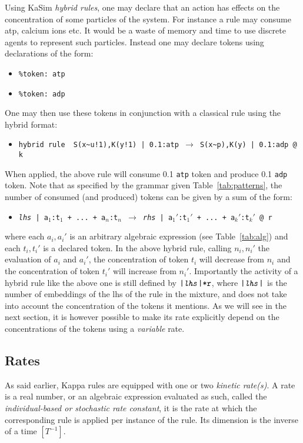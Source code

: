 \documentclass[11pt]{book}
\def\int{\hbox{\texttt{\~}}}
\def\ttt#1{\texttt{#1}}
\def\var#1{\textquotesingle #1\textquotesingle}
\def\rar{\rightarrow}
\def\ITE#1{\begin{itemize}#1\end{itemize}}
\def\imp#1{\emph{#1}\index{#1}}
\begin{document}
Using KaSim \imp{hybrid rules}, one may declare that an action has effects on the concentration of some particles of the system. For instance a rule may consume atp, calcium ions etc. It would be a waste of memory and time to use discrete agents to represent such particles. Instead one may declare tokens using declarations of the form:
\ITE{
\item[] \ttt{\%token: atp} 
\item[] \ttt{\%token: adp} 
}
One may then use these tokens in conjunction with a classical rule using the hybrid format:
\ITE{
\item[] \ttt{\var{hybrid rule}~ S(x\int u!1),K(y!1)\ |\ 0.1:atp $\rar$ S(x\int p),K(y)\ |\ 0.1:adp\ @ \var{k}} 
}
When applied, the above rule will consume 0.1 \ttt{atp} token and produce 0.1 \ttt{adp} token. Note that as specified by the grammar given Table~\ref{tab:patterns}, the number of consumed (and produced) tokens can be given by a sum of the form:
\ITE{
\item[] \ttt{\textit{lhs} | a$_1$:t$_1$ + ... + a$_n$:t$_n$ $\rar$ \textit{rhs} | a$_1'$:t$_1'$ + ... + a$_k'$:t$_k'$ @ r} 
}
where each $a_i,a_i'$ is an arbitrary algebraic expression (see Table~\ref{tab:alg}) and each $t_i,t_i'$ is a declared token. In the above hybrid rule, calling $n_i,n_i'$  the evaluation of $a_i$ and $a_i'$, the concentration of token $t_i$ will decrease from $n_i$ and the concentration of token $t_i'$ will increase from $n_i'$. Importantly the activity of a hybrid rule like the above one is still 
defined by $\ttt{|\textit{lhs}|*r}$, where $\ttt{|\textit{lhs}|}$ is the number of embeddings of the lhs of the rule in the mixture, and does not take into account the concentration of the tokens it mentions. As we will see in the next section, it is however possible to make its rate explicitly depend on the concentrations of the tokens using a \imp{variable} rate.

\subsection{Rates}\label{sec:kinetics}
As said earlier, Kappa rules are equipped with one or two \emph{kinetic rate(s)}. A rate is a real number, or an algebraic expression evaluated as such, called the \emph{individual-based or stochastic rate constant}, it is the rate at which the corresponding rule is applied per instance of the rule. Its dimension is the inverse of a time $[T^{-1}]$.
\end{document}
